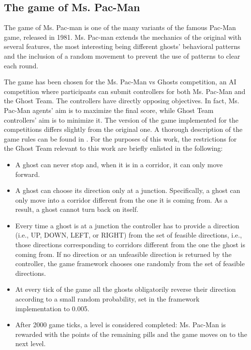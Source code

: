 \documentclass[journal]{IEEEtran}
\begin{document}
\subsection{The game of Ms. Pac-Man}
\label{subsec:GameMsPacMan}
The game of Ms. Pac-man is one of the many variants of the famous
Pac-Man game, released in 1981. Ms. Pac-man  extends the mechanics of
the original with several features, the most interesting being
different ghosts' behavioral patterns and the inclusion of a random
movement to prevent the use of patterns to clear each round.

The game has been chosen for the Ms. Pac-Man vs Ghosts competition, an AI competition where participants can submit controllers for both Ms. Pac-Man and the Ghost Team. The controllers have directly opposing objectives. In fact, Ms. Pac-Man agents' aim is to maximize the final score, while Ghost Team controllers' aim is to minimize it. The version of the game implemented for the competitions differs slightly from the original one. A thorough description of the game rules can be found in \cite{MsPacManVSGhost2011}. For the purposes of this work, the restrictions for the Ghost Team relevant to this work are briefly enlisted in the following:
\begin{itemize}
  \item A ghost can never stop and, when it is in a corridor, it can only move forward.
  \item A ghost can choose its direction only at a junction. Specifically, a ghost can only move into a corridor different from the one it is coming from. As a result, a ghost cannot turn back on itself.
  \item Every time a ghost is at a junction the controller has to provide a direction (i.e., UP, DOWN, LEFT, or RIGHT) from the set of feasible directions, i.e., those directions corresponding to corridors different from the one the ghost is coming from. If no direction or an unfeasible direction is returned by the controller, the game framework chooses one randomly from the set of feasible directions.
  \item At every tick of the game all the ghosts obligatorily reverse their direction according to a small random probability, set in the framework implementation to 0.005.
  \item After 2000 game ticks, a level is considered completed: Ms. Pac-Man is rewarded with the points of the remaining pills and the game moves on to the next level.
\end{itemize}
\end{document}
